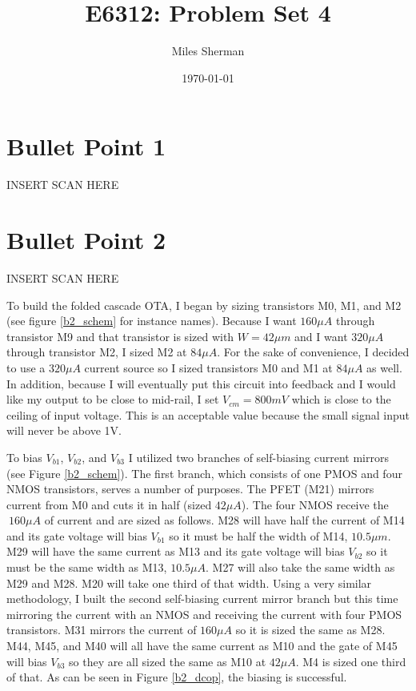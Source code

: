 \documentclass{article}
\begin{document}
\title{E6312: Problem Set 4}
\author{Miles Sherman}
\date{\today}
\maketitle

\section{Bullet Point 1}
INSERT SCAN HERE

\section{Bullet Point 2}
INSERT SCAN HERE

To build the folded cascade OTA, I began by sizing transistors M0, M1, and M2 (see figure \ref{b2_schem} for instance names). Because I want $160\mu A$ through transistor M9 and that transistor is sized with $W = 42\mu m$ and I want $320\mu A$ through transistor M2, I sized M2 at $84\mu A$. For the sake of convenience, I decided to use a $320\mu A$ current source so I sized transistors M0 and M1 at $84\mu A$ as well. In addition, because I will eventually put this circuit into feedback and I would like my output to be close to mid-rail, I set $V_{cm} = 800mV$ which is close to the ceiling of input voltage. This is an acceptable value because the small signal input will never be above 1V.

To bias $V_{b1}$, $V_{b2}$, and $V_{b3}$ I utilized two branches of self-biasing current mirrors (see Figure \ref{b2_schem}). The first branch, which consists of one PMOS and four NMOS transistors, serves a number of purposes. The PFET (M21) mirrors current from M0 and cuts it in half (sized $42\mu A$). The four NMOS receive the $~160\mu A$ of current and are sized as follows. M28 will have half the current of M14 and its gate voltage will bias $V_{b1}$ so it must be half the width of M14, $10.5\mu m$. M29 will have the same current as M13 and its gate voltage will bias $V_{b2}$ so it must be the same width as M13, $10.5\mu A$. M27 will also take the same width as M29 and M28. M20 will take one third of that width. Using a very similar methodology, I built the second self-biasing current mirror branch but this time mirroring the current with an NMOS and receiving the current with four PMOS transistors. M31 mirrors the current of $160\mu A$ so it is sized the same as M28. M44, M45, and M40 will all have the same current as M10 and the gate of M45 will bias $V_{b3}$ so they are all sized the same as M10 at $42\mu A$. M4 is sized one third of that. As can be seen in Figure \ref{b2_dcop}, the biasing is successful.
\end{document}
